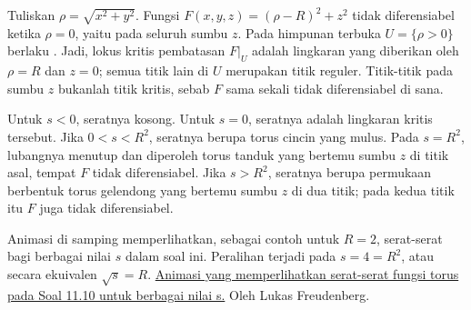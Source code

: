 Tuliskan $\rho=\sqrt{x^2+y^2}$. Fungsi
$F(x,y,z)=(\rho-R)^2+z^2$ tidak diferensiabel ketika $\rho=0$, yaitu pada seluruh sumbu $z$. Pada himpunan terbuka $U=\{\rho>0\}$ berlaku
 { . }
Jadi, lokus kritis pembatasan $F\vert_U$ adalah lingkaran yang diberikan oleh $\rho=R$ dan $z=0$; semua titik lain di $U$ merupakan titik reguler. Titik-titik pada sumbu $z$ bukanlah titik kritis, sebab $F$ sama sekali tidak diferensiabel di sana.

Untuk $s<0$, seratnya kosong. Untuk $s=0$, seratnya adalah lingkaran kritis tersebut. Jika $0<s<R^2$, seratnya berupa torus cincin yang mulus. Pada $s=R^2$, lubangnya menutup dan diperoleh torus tanduk yang bertemu sumbu $z$ di titik asal, tempat $F$ tidak diferensiabel. Jika $s>R^2$, seratnya berupa permukaan berbentuk torus gelendong yang bertemu sumbu $z$ di dua titik; pada kedua titik itu $F$ juga tidak diferensiabel.

Animasi di samping memperlihatkan, sebagai contoh untuk $R=2$, serat-serat bagi berbagai nilai $s$ dalam soal ini. Peralihan terjadi pada $s=4=R^2$, atau secara ekuivalen $\sqrt{s}=R$.
\href{https://commons.wikimedia.org/wiki/File:Aufgabe79.27.gif}{Animasi yang memperlihatkan serat-serat fungsi torus pada Soal 11.10 untuk berbagai nilai s.}
Oleh Lukas Freudenberg.

